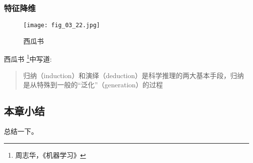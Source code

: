 	 
	


\subsubsection{特征降维}
\begin{figure}[h]  %
	\centering
	\texttt{[image: fig\_03\_22.jpg]}
	\caption{西瓜书}
	\label{}
\end{figure}

西瓜书 \footnote{周志华，《机器学习》}中写道:
\begin{quotation}
{\kaishu 归纳（induction）和演绎（deduction）是科学推理的两大基本手段，归纳是从特殊到一般的“泛化”（generation）的过程}	
\end{quotation}



\subsection{本章小结}
总结一下。

\setcounter{table}{0}  %
\setcounter{figure}{0} %
\setcounter{equation}{0} %